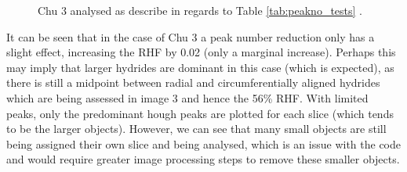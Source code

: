 \documentclass{article}
\begin{document}
    \begin{figure}[H]
        \centering
        \hfill
        \caption{Chu 3 analysed as describe in regards to Table \ref{tab:peakno_tests} .}
    \label{fig:chu3_PN_comparison}
    \end{figure}
    
    \noindent It can be seen that in the case of Chu 3 a peak number reduction only has a slight effect, increasing the RHF by 0.02 (only a marginal increase). Perhaps this may imply that larger hydrides are dominant in this case (which is expected), as there is still a midpoint between radial and circumferentially aligned hydrides which are being assessed in image 3 and hence the 56\% RHF. With limited peaks, only the predominant hough peaks are plotted for each slice (which tends to be the larger objects). However, we can see that many small objects are still being assigned their own slice and being analysed, which is an issue with the code and would require greater image processing steps to remove these smaller objects.
    
\end{document}
